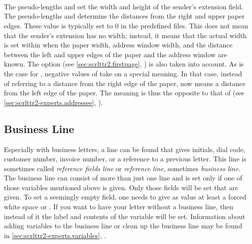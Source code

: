 \begin{Declaration}
  \\
  \\
  \\
\end{Declaration}
%
%
%
%
The pseudo-lengths  and
 set the width and
height of the sender's extension field. The pseudo-lengths 
and  determine the distances from the right and upper paper
edges. These value is typically set to 0 in the predefined 
files. This does not mean that the sender's extension has
no width; instead, it means that the actual width is set within 
when the paper width, address window width, and the distance between the left
and upper edges of the paper and the address window are known. The option
 (see \autoref{sec:scrlttr2.firstpage},
) is also taken into account. As is
the case for , negative values of  take
on a special meaning. In that case, instead of referring to a distance from
the right edge of the paper,  now means a distance from the
left edge of the paper. The meaning is thus the opposite to that of
 (see \autoref{sec:scrlttr2-experts.addressee},
).%
%
%
%
%
%


\subsection{Business Line}
\label{sec:scrlttr2-experts.refLine}%

Especially with business letters, a line can be found that gives initials,
dial code, customer number, invoice number, or a reference to a previous
letter.  This line is sometimes called \emph{reference fields line} or
\emph{reference line}, sometimes \emph{business line}. The business line can
consist of more than just one line and is set only if one of those variables
mentioned above is given. Only those fields will be set that are
given. To set a seemingly empty field, one needs to give as
value at least a forced white space or . If you want to have your
letter without a business line, then instead of it the label and contents of
the variable  will be set. Information about adding variables
to the business line or clean up the business line may be found in
\autoref{sec:scrlttr2-experts.variables},
.

